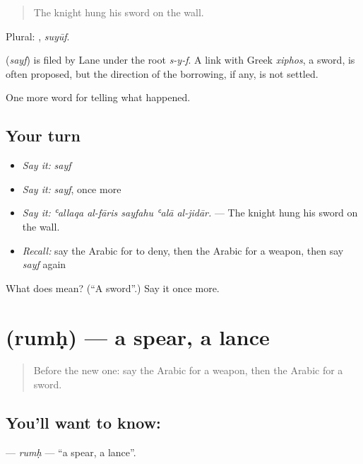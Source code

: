 \begin{quote}
The knight hung his sword on the wall.
\end{quote}

Plural: , \emph{suyūf}.

\begin{cousinweb}
\textbf{} (\emph{sayf}) is filed by Lane under the root \emph{s-y-f}. A link with Greek \emph{xiphos}, a sword, is often proposed, but the direction of the borrowing, if any, is not settled.
\end{cousinweb}

\begin{grammarlens}[title={What you've built}]
One more word for telling what happened.
\end{grammarlens}

\subsection*{Your turn}
\begin{itemize}
\raggedright
  \item \emph{Say it:} \emph{sayf}
  \item \emph{Say it:} \emph{sayf}, once more
  \item \emph{Say it:} \emph{ʿallaqa al-fāris sayfahu ʿalā al-jidār.} — The knight hung his sword on the wall.
  \item \emph{Recall:} say the Arabic for to deny, then the Arabic for a weapon, then say \emph{sayf} again
\end{itemize}

\begin{tcolorbox}[breakable,colback=teal!4,colframe=teal!35!black,title={Before you move on}]
What does  mean? (\textquotedblleft{}A sword\textquotedblright{}.) Say it once more.
\end{tcolorbox}
\section[\texorpdfstring{\ar{رمح} (rumḥ)}{رمح (rumḥ)}]{ (rumḥ) — a spear, a lance}

\label{lesson:AR-C326-rumh}



\begin{quote}
Before the new one: say the Arabic for a weapon, then the Arabic for a sword.
\end{quote}

\subsection*{You'll want to know: }
\textbf{} — \emph{rumḥ} — \textquotedblleft{}a spear, a lance\textquotedblright{}.

